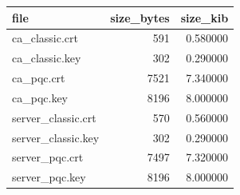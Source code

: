 \begin{tabular}{lrr}
\toprule
file & size_bytes & size_kib \\
\midrule
ca_classic.crt & 591 & 0.580000 \\
ca_classic.key & 302 & 0.290000 \\
ca_pqc.crt & 7521 & 7.340000 \\
ca_pqc.key & 8196 & 8.000000 \\
server_classic.crt & 570 & 0.560000 \\
server_classic.key & 302 & 0.290000 \\
server_pqc.crt & 7497 & 7.320000 \\
server_pqc.key & 8196 & 8.000000 \\
\bottomrule
\end{tabular}
